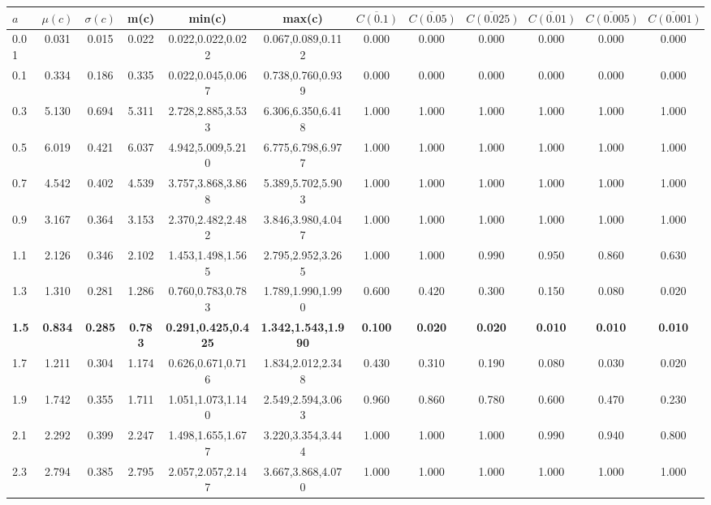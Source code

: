 \begin{table*}[h!]
\begin{center}
\begin{tabular}{| l | c | c | c | c | c | c | c | c | c | c | c |}\hline
$a$ & $\mu(c)$ & $\sigma(c)$ & m(c) & min(c) & max(c) & $\overline{C(0.1)}$ & $\overline{C(0.05)}$ & $\overline{C(0.025)}$ & $\overline{C(0.01)}$ & $\overline{C(0.005)}$ & $\overline{C(0.001)}$ \\\hline\hline
0.01 & 0.031 & 0.015 & 0.022 & 0.022,0.022,0.022 & 0.067,0.089,0.112  & 0.000  & 0.000  & 0.000  & 0.000  & 0.000  & 0.000 \\\hline
0.1 & 0.334 & 0.186 & 0.335 & 0.022,0.045,0.067 & 0.738,0.760,0.939  & 0.000  & 0.000  & 0.000  & 0.000  & 0.000  & 0.000 \\\hline
0.3 & 5.130 & 0.694 & 5.311 & 2.728,2.885,3.533 & 6.306,6.350,6.418  & 1.000  & 1.000  & 1.000  & 1.000  & 1.000  & 1.000 \\\hline
0.5 & 6.019 & 0.421 & 6.037 & 4.942,5.009,5.210 & 6.775,6.798,6.977  & 1.000  & 1.000  & 1.000  & 1.000  & 1.000  & 1.000 \\\hline
0.7 & 4.542 & 0.402 & 4.539 & 3.757,3.868,3.868 & 5.389,5.702,5.903  & 1.000  & 1.000  & 1.000  & 1.000  & 1.000  & 1.000 \\\hline
0.9 & 3.167 & 0.364 & 3.153 & 2.370,2.482,2.482 & 3.846,3.980,4.047  & 1.000  & 1.000  & 1.000  & 1.000  & 1.000  & 1.000 \\\hline
1.1 & 2.126 & 0.346 & 2.102 & 1.453,1.498,1.565 & 2.795,2.952,3.265  & 1.000  & 1.000  & 0.990  & 0.950  & 0.860  & 0.630 \\\hline
1.3 & 1.310 & 0.281 & 1.286 & 0.760,0.783,0.783 & 1.789,1.990,1.990  & 0.600  & 0.420  & 0.300  & 0.150  & 0.080  & 0.020 \\\hline
{\bf 1.5} & {\bf 0.834} & {\bf 0.285} & {\bf 0.783} & {\bf 0.291,0.425,0.425} & {\bf 1.342,1.543,1.990} & {\bf 0.100} & {\bf 0.020} & {\bf 0.020} & {\bf 0.010} & {\bf 0.010} & {\bf 0.010} \\\hline
1.7 & 1.211 & 0.304 & 1.174 & 0.626,0.671,0.716 & 1.834,2.012,2.348  & 0.430  & 0.310  & 0.190  & 0.080  & 0.030  & 0.020 \\\hline
1.9 & 1.742 & 0.355 & 1.711 & 1.051,1.073,1.140 & 2.549,2.594,3.063  & 0.960  & 0.860  & 0.780  & 0.600  & 0.470  & 0.230 \\\hline
2.1 & 2.292 & 0.399 & 2.247 & 1.498,1.655,1.677 & 3.220,3.354,3.444  & 1.000  & 1.000  & 1.000  & 0.990  & 0.940  & 0.800 \\\hline
2.3 & 2.794 & 0.385 & 2.795 & 2.057,2.057,2.147 & 3.667,3.868,4.070  & 1.000  & 1.000  & 1.000  & 1.000  & 1.000  & 1.000 \\\hline

\end{tabular}
\end{center}
\end{table*}
